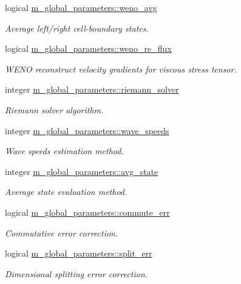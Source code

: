 \begin{DoxyCompactItemize}
logical \hyperlink{namespacem__global__parameters_a1b38593c502f05d17607529d38c97a82}{m\+\_\+global\+\_\+parameters\+::weno\+\_\+avg}
\begin{DoxyCompactList}\small\item\em Average left/right cell-\/boundary states. \end{DoxyCompactList}\item 
logical \hyperlink{namespacem__global__parameters_a3c3cd38abc3ece085bab77788afece73}{m\+\_\+global\+\_\+parameters\+::weno\+\_\+re\+\_\+flux}
\begin{DoxyCompactList}\small\item\em W\+E\+NO reconstruct velocity gradients for viscous stress tensor. \end{DoxyCompactList}\item 
integer \hyperlink{namespacem__global__parameters_a6b9c81f07f8444654924e3075e4edaf8}{m\+\_\+global\+\_\+parameters\+::riemann\+\_\+solver}
\begin{DoxyCompactList}\small\item\em Riemann solver algorithm. \end{DoxyCompactList}\item 
integer \hyperlink{namespacem__global__parameters_a0f798e4b3d19b7d49d747cc89cbe0b69}{m\+\_\+global\+\_\+parameters\+::wave\+\_\+speeds}
\begin{DoxyCompactList}\small\item\em Wave speeds estimation method. \end{DoxyCompactList}\item 
integer \hyperlink{namespacem__global__parameters_a1a3314b39e21e17d7e72a9837db2ab42}{m\+\_\+global\+\_\+parameters\+::avg\+\_\+state}
\begin{DoxyCompactList}\small\item\em Average state evaluation method. \end{DoxyCompactList}\item 
logical \hyperlink{namespacem__global__parameters_a5a340deb003a37dc81b7a560343242b1}{m\+\_\+global\+\_\+parameters\+::commute\+\_\+err}
\begin{DoxyCompactList}\small\item\em Commutative error correction. \end{DoxyCompactList}\item 
logical \hyperlink{namespacem__global__parameters_a9adf65c5de7c360aa44f595f561c87b0}{m\+\_\+global\+\_\+parameters\+::split\+\_\+err}
\begin{DoxyCompactList}\small\item\em Dimensional splitting error correction. \end{DoxyCompactList}\item 

\end{DoxyCompactItemize}
